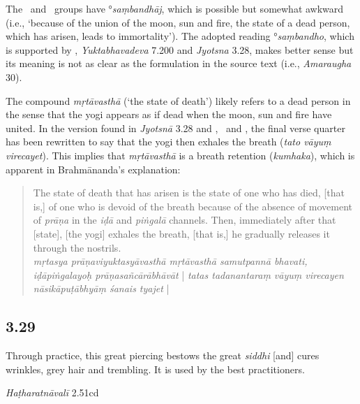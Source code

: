 \begin{ekdosis}
\begin{philcomm}[hp03_028]
The \textalpha\ and \textgamma\ groups have °\emph{saṃbandhāj}, which is possible but somewhat awkward (i.e., `because of the union of the moon, sun and fire, the state of a dead person, which has arisen, leads to immortality'). The adopted reading °\emph{saṃbandho}, which is supported by \epsilonTwo, \emph{Yuktabhavadeva} 7.200 and \emph{Jyotsna} 3.28, makes better sense but its meaning is not as clear as the formulation in the source text (i.e., \emph{Amaraugha} 30).

The compound \emph{mṛtāvasthā} (`the state of death') likely refers to a dead person in the sense that the yogi appears as if dead when the moon, sun and fire have united. In the version found in \emph{Jyotsnā} 3.28 and \etaOne, \etaTwo\ and \epsilonThree, the final verse quarter has been rewritten to say that the yogi then exhales the breath (\emph{tato vāyuṃ virecayet}). This implies that \emph{mṛtāvasthā} is a breath retention (\emph{kumhaka}), which is apparent in Brahmānanda's explanation:
\begin{quote}
The state of death that has arisen is the state of one who has died, [that is,] of one who is devoid of the breath because of the absence of movement of \emph{prāṇa} in the \emph{iḍā} and \emph{piṅgalā} channels. Then, immediately after that [state], [the yogi] exhales the breath, [that is,] he gradually releases it through the nostrils.\\
\emph{mṛtasya prāṇaviyuktasyāvasthā mṛtāvasthā samutpannā bhavati, iḍāpiṅgalayoḥ prāṇasañcārābhāvāt} | \emph{tatas tadanantaraṃ vāyuṃ virecayen nāsikāpuṭābhyāṃ śanais tyajet} |
\end{quote}

\end{philcomm}

\subsection*{3.29}
\begin{translation}[hp03_029]
Through practice, this great piercing bestows the great \emph{siddhi} [and] cures wrinkles, grey hair and trembling. It is used by the best practitioners.
\end{translation}


\begin{testimonia}[hp03_029]
\emph{Haṭharatnāvalī} 2.51cd
\begin{versinnote}
\end{versinnote}


\end{testimonia}
\end{ekdosis}
